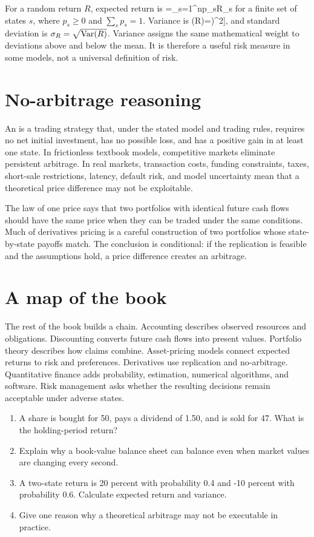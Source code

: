 For a random return $R$, expected return is
  \E[R]=\sum_{s=1}^{n}p_sR_s
\closeformula
for a finite set of states $s$, where $p_s\geq0$ and $\sum_sp_s=1$. Variance is
  \Var(R)=\E\left[(R-\E[R])^2\right],
\closeformula
and standard deviation is $\sigma_R=\sqrt{\operatorname{Var}(R)}$. Variance assigns the same mathematical weight to deviations above and below the mean. It is therefore a useful risk measure in some models, not a universal definition of risk.

\section{No-arbitrage reasoning}
An  is a trading strategy that, under the stated model and trading rules, requires no net initial investment, has no possible loss, and has a positive gain in at least one state. In frictionless textbook models, competitive markets eliminate persistent arbitrage. In real markets, transaction costs, funding constraints, taxes, short-sale restrictions, latency, default risk, and model uncertainty mean that a theoretical price difference may not be exploitable.

The law of one price says that two portfolios with identical future cash flows should have the same price when they can be traded under the same conditions. Much of derivatives pricing is a careful construction of two portfolios whose state-by-state payoffs match. The conclusion is conditional: if the replication is feasible and the assumptions hold, a price difference creates an arbitrage.

\section{A map of the book}
The rest of the book builds a chain. Accounting describes observed resources and obligations. Discounting converts future cash flows into present values. Portfolio theory describes how claims combine. Asset-pricing models connect expected returns to risk and preferences. Derivatives use replication and no-arbitrage. Quantitative finance adds probability, estimation, numerical algorithms, and software. Risk management asks whether the resulting decisions remain acceptable under adverse states.

\begin{exerciseblock}
\begin{enumerate}
  \item A share is bought for 50, pays a dividend of 1.50, and is sold for 47. What is the holding-period return?
  \item Explain why a book-value balance sheet can balance even when market values are changing every second.
  \item A two-state return is 20 percent with probability 0.4 and -10 percent with probability 0.6. Calculate expected return and variance.
  \item Give one reason why a theoretical arbitrage may not be executable in practice.
\end{enumerate}
\end{exerciseblock}

